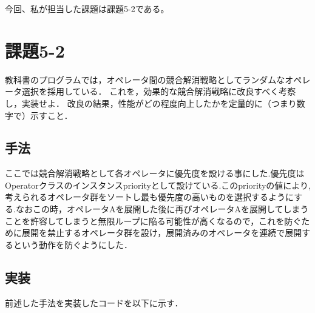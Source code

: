 \documentclass[a4j]{jarticle}
\begin{document}
今回、私が担当した課題は課題5-2である。

\section{課題5-2}
\begin{screen}
教科書のプログラムでは，オペレータ間の競合解消戦略としてランダムなオペレータ選択を採用している．
これを，効果的な競合解消戦略に改良すべく考察し，実装せよ．
改良の結果，性能がどの程度向上したかを定量的に（つまり数字で）示すこと．
\end{screen}

\subsection{手法}
ここでは競合解消戦略として各オペレータに優先度を設ける事にした.優先度はOperatorクラスのインスタンスpriorityとして設けている.このpriorityの値により,考えられるオペレータ群をソートし最も優先度の高いものを選択するようにする.なおこの時，オペレータAを展開した後に再びオペレータAを展開してしまうことを許容してしまうと無限ループに陥る可能性が高くなるので，これを防ぐために展開を禁止するオペレータ群を設け，展開済みのオペレータを連続で展開するという動作を防ぐようにした．

\subsection{実装}
前述した手法を実装したコードを以下に示す．
\end{document}
